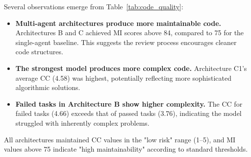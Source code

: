 \begin{table}[ht]
    \centering
    \caption{Static Code Quality Metrics by Architecture.}
    \label{tab:code_quality}
\end{table}

Several observations emerge from Table~\ref{tab:code_quality}:

\begin{itemize}
    \item \textbf{Multi-agent architectures produce more maintainable code.} Architectures B and C achieved MI scores above 84, compared to 75 for the single-agent baseline. This suggests the review process encourages cleaner code structures.
    \item \textbf{The strongest model produces more complex code.} Architecture C1's average CC (4.58) was highest, potentially reflecting more sophisticated algorithmic solutions.
    \item \textbf{Failed tasks in Architecture B show higher complexity.} The CC for failed tasks (4.66) exceeds that of passed tasks (3.76), indicating the model struggled with inherently complex problems.
\end{itemize}

All architectures maintained CC values in the "low risk" range (1--5), and MI values above 75 indicate "high maintainability" according to standard thresholds.
